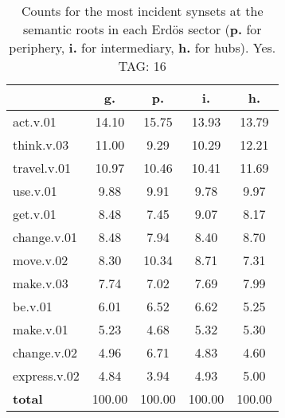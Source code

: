 \begin{table}[h!]
\begin{center}
\begin{tabular}{| l || c | c | c | c |}\hline
 & {\bf g.} & {\bf p.} & {\bf i.} & {\bf h.} \\\hline\hline
act.v.01 & 14.10  & 15.75  & 13.93  & 13.79 \\\hline
think.v.03 & 11.00  & 9.29  & 10.29  & 12.21 \\\hline
travel.v.01 & 10.97  & 10.46  & 10.41  & 11.69 \\\hline
use.v.01 & 9.88  & 9.91  & 9.78  & 9.97 \\\hline
get.v.01 & 8.48  & 7.45  & 9.07  & 8.17 \\\hline
change.v.01 & 8.48  & 7.94  & 8.40  & 8.70 \\\hline
move.v.02 & 8.30  & 10.34  & 8.71  & 7.31 \\\hline
make.v.03 & 7.74  & 7.02  & 7.69  & 7.99 \\\hline
be.v.01 & 6.01  & 6.52  & 6.62  & 5.25 \\\hline
make.v.01 & 5.23  & 4.68  & 5.32  & 5.30 \\\hline
change.v.02 & 4.96  & 6.71  & 4.83  & 4.60 \\\hline
express.v.02 & 4.84  & 3.94  & 4.93  & 5.00 \\\hline\hline
{{\bf total}} & 100.00  & 100.00  & 100.00  & 100.00 \\\hline
\end{tabular}
\caption{Counts for the most incident synsets at the semantic roots in each Erd\"os sector ({\bf p.} for periphery, {\bf i.} for intermediary, {\bf h.} for hubs). Yes. TAG: 16}
\end{center}
\end{table}